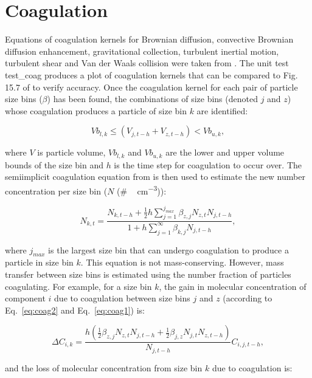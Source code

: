 \documentclass[gmd, manuscript]{copernicus}
\begin{document}
\section{Coagulation}\label{sec:coag}

Equations of coagulation kernels for Brownian diffusion, convective Brownian diffusion enhancement, gravitational collection, turbulent inertial motion, turbulent shear and Van der Waals collision were taken from \citet{Jacobson2005}.  The unit test test\_coag produces a plot of coagulation kernels that can be compared to Fig. 15.7 of \citet{Jacobson2005} to verify accuracy.  Once the coagulation kernel for each pair of particle size bins ($\beta$) has been found, the combinations of size bins (denoted $j$ and $z$) whose coagulation produces a particle of size bin $k$ are identified:

 \begin{equation} \label{eq:coag2}
Vb_{l,k} \leq (V_{j,t-h}+V_{z,t-h}) < Vb_{u,k},
\end{equation}

where $V$ is particle volume, $Vb_{l,k}$ and $Vb_{u,k}$ are the lower and upper volume bounds of the size bin and $h$ is the time step for coagulation to occur over.  The semiimplicit coagulation equation from \citet{Jacobson2005} is then used to estimate the new number concentration per size bin ($N$ (\unit{\#\, cm^{-3}})):

\begin{equation} \label{eq:coag1}
N_{k,t} = \frac{N_{k,t-h}+\frac{1}{2}h\sum_{j=1}^{j_{max}}\beta_{z,j}N_{z,t}N_{j,t-h}}{1+h\sum_{j=1}^{\infty}\beta_{k,j}N_{j,t-h}},
\end{equation}

where $j_{max}$ is the largest size bin that can undergo coagulation to produce a particle in size bin $k$.  This equation is not mass-conserving.  However, mass transfer between size bins is estimated using the number fraction of particles coagulating.  For example, for a size bin $k$, the gain in molecular concentration of component $i$ due to coagulation between size bins $j$ and $z$ (according to Eq.~\ref{eq:coag2} and Eq.~\ref{eq:coag1}) is:

\begin{equation} \label{eq:coag3}
\Delta C_{i,k} = \frac{h(\frac{1}{2}\beta_{z,j}N_{z,t}N_{j,t-h}+\frac{1}{2}\beta_{j,z}N_{j,t}N_{z,t-h})}{N_{j,t-h}}C_{i,j,t-h},
\end{equation}

and the loss of molecular concentration from size bin $k$ due to coagulation is:
\end{document}
